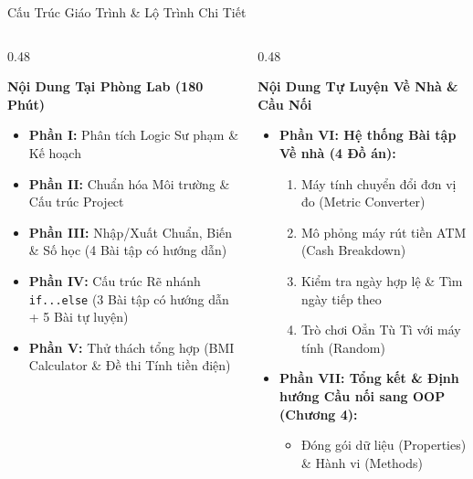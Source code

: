 \documentclass[aspectratio=169, 10pt]{beamer}
\begin{document}
\begin{frame}{Cấu Trúc Giáo Trình \& Lộ Trình Chi Tiết}
  \begin{columns}[T]
    \begin{column}{0.48\textwidth}
      \begin{block}{\textbf{Nội Dung Tại Phòng Lab (180 Phút)}}
        \begin{itemize}
          \item \textbf{Phần I:} Phân tích Logic Sư phạm \& Kế hoạch
          \item \textbf{Phần II:} Chuẩn hóa Môi trường \& Cấu trúc Project
          \item \textbf{Phần III:} Nhập/Xuất Chuẩn, Biến \& Số học (4 Bài tập có hướng dẫn)
          \item \textbf{Phần IV:} Cấu trúc Rẽ nhánh \texttt{if...else} (3 Bài tập có hướng dẫn + 5 Bài tự luyện)
          \item \textbf{Phần V:} Thử thách tổng hợp (BMI Calculator \& Đề thi Tính tiền điện)
        \end{itemize}
      \end{block}
    \end{column}
    \begin{column}{0.48\textwidth}
      \begin{exampleblock}{\textbf{Nội Dung Tự Luyện Về Nhà \& Cầu Nối}}
        \begin{itemize}
          \item \textbf{Phần VI: Hệ thống Bài tập Về nhà (4 Đồ án):}
            \begin{enumerate}
              \item Máy tính chuyển đổi đơn vị đo (Metric Converter)
              \item Mô phỏng máy rút tiền ATM (Cash Breakdown)
              \item Kiểm tra ngày hợp lệ \& Tìm ngày tiếp theo
              \item Trò chơi Oẳn Tù Tì với máy tính (Random)
            \end{enumerate}
          \item \textbf{Phần VII: Tổng kết \& Định hướng Cầu nối sang OOP (Chương 4):}
            \begin{itemize}
              \item Đóng gói dữ liệu (Properties) \& Hành vi (Methods)
            \end{itemize}
        \end{itemize}
      \end{exampleblock}
    \end{column}
  \end{columns}
\end{frame}
\end{document}
